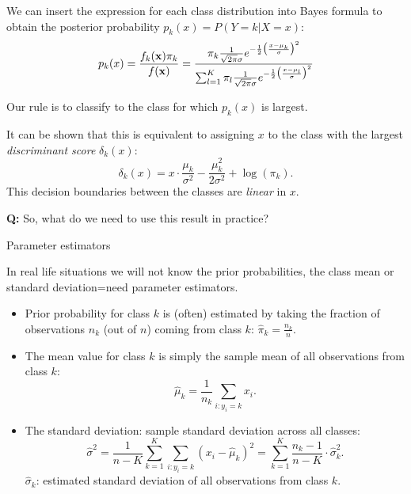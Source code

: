\documentclass[10pt,ignorenonframetext,]{beamer}
\begin{document}
\begin{frame}

We can insert the expression for each class distribution into Bayes
formula to obtain the posterior probability
\(p_k(x) = P(Y = k | X = x)\):
\[p_k(x) = \frac{f_k({\bf x}) \pi_k}{f({\bf x})}=\frac{\pi_k \frac{1}{\sqrt{2\pi}\sigma} e^{-\frac{1}{2}\big(\frac{x-\mu_k}{\sigma}\big)^2}}{\sum_{l=1}^K \pi_l \frac{1}{\sqrt{2\pi}\sigma} e^{-\frac{1}{2}\big(\frac{x-\mu_l}{\sigma}\big)^2}} \]

Our rule is to classify to the class for which \(p_k(x)\) is largest.

It can be shown that this is equivalent to assigning \(x\) to the class
with the largest \emph{discriminant score} \(\delta_k(x)\):
\[\delta_k(x) = x\cdot \frac{\mu_k}{\sigma^2} - \frac{\mu_k^2}{2 \sigma^2}+\log(\pi_k).\]
This decision boundaries between the classes are \emph{linear} in \(x\).

\textbf{Q:} So, what do we need to use this result in practice?

\end{frame}

\begin{frame}

\begin{block}{Parameter estimators}

In real life situations we will not know the prior probabilities, the
class mean or standard deviation=need parameter estimators.

\begin{itemize}
\item
  Prior probability for class \(k\) is (often) estimated by taking the
  fraction of observations \(n_k\) (out of \(n\)) coming from class
  \(k\): \(\hat{\pi}_k = \frac{n_k}{n}.\)
\item
  The mean value for class \(k\) is simply the sample mean of all
  observations from class \(k\):
  \[\hat{\mu}_k = \frac{1}{n_k}\sum_{i:y_i=k} x_i.\]
\item
  The standard deviation: sample standard deviation across all classes:
  \[\hat{\sigma}^2=\frac{1}{n-K}\sum_{k=1}^K \sum_{i: y_i=k} (x_i-\hat{\mu}_k)^2 = \sum_{k=1}^K \frac{n_k - 1}{n - K} \cdot \hat{\sigma}_k^2.\]
  \(\hat{\sigma}_k\): estimated standard deviation of all observations
  from class \(k\).
\end{itemize}

\end{block}

\end{frame}
\end{document}
